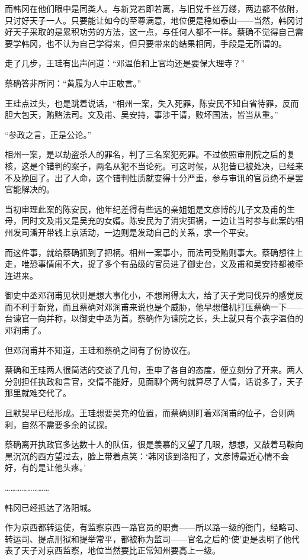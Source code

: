 而韩冈在他们眼中是同类人。与新党若即若离，与旧党千丝万缕，两边都不依附，只讨好天子一人。只要能让如今的至尊满意，地位便是稳如泰山——当然，韩冈讨好天子采取的是累积功劳的方法，这一点，与任何人都不一样。蔡确不觉得自己需要学韩冈，也不认为自己学得来，但只要带来的结果相同，手段是无所谓的。

走了几步，王珪有出声问道：“邓温伯和上官均还是要保大理寺？”

蔡确答非所问：“黄履为人中正敢言。”

王珪点过头，也是跳着说话，“相州一案，失入死罪，陈安民不知自省待罪，反而胆大包天，贿赂法司。文及甫、吴安持，事涉干请，败坏国法，皆当从重。”

“参政之言，正是公论。”

相州一案，是以劫盗杀人的罪名，判了三名案犯死罪。不过依照审刑院之后的复核，这是个错判的案子，两名从犯不当论死。可这时候，从犯皆已被处决，已经来不及挽回了。出了人命，这个错判性质就变得十分严重，参与审讯的官员绝不是罢官能解决的。

当初审理此案的陈安民，他年纪差得有些远的亲姐姐是文彦博的儿子文及甫的生母，同时文及甫又是吴充的女婿。陈安民为了消灾弭祸，一边让当时参与此案的相州发司潘开带钱上京活动，一边则是发动自己的关系，求一个平安。

而这件事，就给蔡确抓到了把柄。相州一案事小，而法司受贿则事大。蔡确想往上走，唯恐事情闹不大，捉了多个有品级的官员进了御史台，文及甫和吴安持都被牵连进来。

御史中丞邓润甫见状则是想大事化小，不想闹得太大，给了天子党同伐异的感觉反而不利于新党，而且蔡确对邓润甫来说也是个威胁，他早想借机打压蔡确一下——台谏官一向并称，以御史中丞为首。蔡确作为谏院之长，头上就只有个表字温伯的邓润甫了。

但邓润甫并不知道，王珪和蔡确之间有了份协议在。

蔡确和王珪两人很简洁的交谈了几句，重申了各自的态度，便立刻分了开来。两人分别担任执政和言官，交情不能好，见面聊个两句就算尽了人情，话说多了，天子那里就难交代了。

且默契早已经形成。王珪想要吴充的位置，而蔡确则盯着邓润甫的位子，合则两利，自然不需要多余的试探。

蔡确离开执政官多达数十人的队伍，很是羡慕的又望了几眼，想想，又敲着马鞍向黑沉沉的西方望过去，脸上带着点笑：‘韩冈该到洛阳了，文彦博最近心情不会好，有的是让他头疼。’

……………………

韩冈已经抵达了洛阳城。

作为京西都转运使，有监察京西一路官员的职责——所以路一级的衙门，经略司、转运司、提点刑狱和提举常平，都被称为监司——官名之后的‘使’更是表明了他代表了天子对京西监察，地位当然要比正常知州要高上一级。

